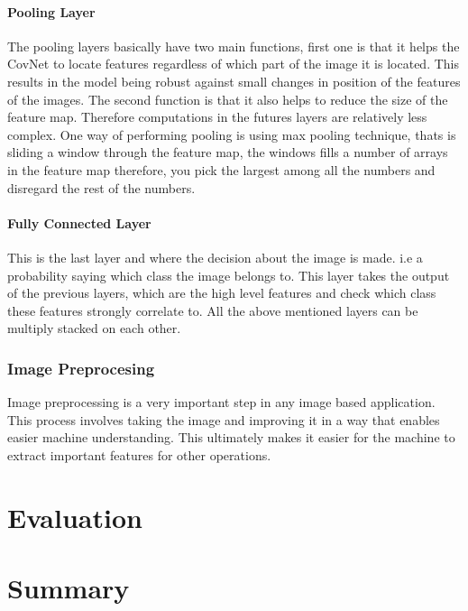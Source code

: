 \documentclass[12pt, a4paper,oneside]{report}
\begin{document}
\subsubsection{Pooling Layer}
The pooling layers basically have two main functions, first one is that it helps the CovNet to locate features regardless of which part of the image it is located. This results in the model being robust against small changes in position of the features of the images. The second function is that it also helps to reduce the size of the feature map. Therefore computations in the futures layers are relatively less complex. One way of performing pooling is using max pooling technique, thats is sliding a window through the feature map, the windows fills a number of arrays in the feature map therefore, you pick the largest among all the numbers and disregard the rest of the numbers. 

\subsubsection{Fully Connected Layer}
This is the last layer and where the decision about the image is made. i.e a probability saying which class the image belongs to. This layer takes the output of the previous layers, which are the high level features and check which class these features strongly correlate to. All the above mentioned layers can be multiply stacked 
on each other.


\subsection{Image Preprocesing}
Image preprocessing is a very important step in any image based application. This process involves taking the image and improving it in a way that enables easier machine understanding. This ultimately makes it easier for the machine to extract important features for other operations. 

\chapter{Evaluation}


\chapter{Summary}



\end{document}
